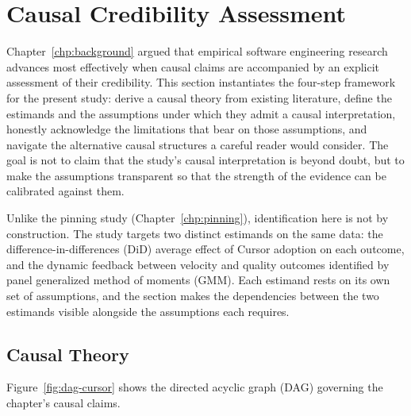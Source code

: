 \section{Causal Credibility Assessment}
\label{sec:cursor-credibility}

Chapter~\ref{chp:background} argued that empirical software engineering research advances most effectively when causal claims are accompanied by an explicit assessment of their credibility.
This section instantiates the four-step framework for the present study: derive a causal theory from existing literature, define the estimands and the assumptions under which they admit a causal interpretation, honestly acknowledge the limitations that bear on those assumptions, and navigate the alternative causal structures a careful reader would consider.
The goal is not to claim that the study's causal interpretation is beyond doubt, but to make the assumptions transparent so that the strength of the evidence can be calibrated against them.

Unlike the pinning study (Chapter~\ref{chp:pinning}), identification here is not by construction.
The study targets two distinct estimands on the same data: the difference-in-differences (DiD) average effect of Cursor adoption on each outcome, and the dynamic feedback between velocity and quality outcomes identified by panel generalized method of moments (GMM).
Each estimand rests on its own set of assumptions, and the section makes the dependencies between the two estimands visible alongside the assumptions each requires.

\subsection{Causal Theory}
\label{sec:cursor-credibility-theory}

Figure~\ref{fig:dag-cursor} shows the directed acyclic graph (DAG) governing the chapter's causal claims.

